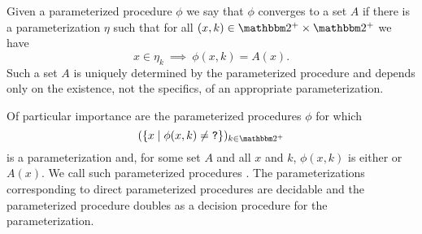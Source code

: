 

Given a parameterized procedure $\phi$ we say that $\phi$ converges to a set $A$ if there is a parameterization $\eta$ such that for all $(x, k) \in \binary^+ \times \binary^+$ we have
\begin{equation*}
  x \in \eta_k \:\implies\: \phi(x, k) = A(x).
\end{equation*}
Such a set $A$ is uniquely determined by the parameterized procedure and depends only on the existence, not the specifics, of an appropriate parameterization.

Of particular importance are the parameterized procedures $\phi$ for which
\begin{equation*}
  (\{x \st \phi(x, k) \neq \bits{?}\})_{k \in \binary^+}
\end{equation*}
is a parameterization and, for some set $A$ and all $x$ and $k$, $\phi(x, k)$ is either  or $A(x)$.
We call such parameterized procedures .
The parameterizations corresponding to direct parameterized procedures are decidable and the parameterized procedure doubles as a decision procedure for the parameterization. %
